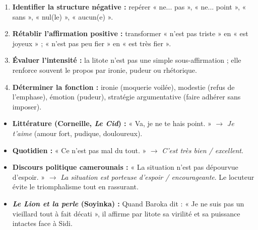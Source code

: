 \documentclass[11pt]{article}
\begin{document}
\begin{methode}
\begin{enumerate}
    \item \textbf{Identifier la structure négative :} repérer « ne... pas », « ne... point », « sans », « nul(le) », « aucun(e) ».
    \item \textbf{Rétablir l'affirmation positive :} transformer « n'est pas triste » en « est joyeux » ; « n'est pas peu fier » en « est très fier ».
    \item \textbf{Évaluer l'intensité :} la litote n'est pas une simple sous-affirmation ; elle renforce souvent le propos par ironie, pudeur ou rhétorique.
    \item \textbf{Déterminer la fonction :} ironie (moquerie voilée), modestie (refus de l'emphase), émotion (pudeur), stratégie argumentative (faire adhérer sans imposer).
\end{enumerate}
\end{methode}

\begin{exemplebox}
\begin{itemize}
    \item \textbf{Littérature (Corneille, \emph{Le Cid}) :} « Va, je ne te hais point. » $\rightarrow$ \emph{Je t'aime} (amour fort, pudique, douloureux).
    \item \textbf{Quotidien :} « Ce n'est pas mal du tout. » $\rightarrow$ \emph{C'est très bien / excellent}.
    \item \textbf{Discours politique camerounais :} « La situation n'est pas dépourvue d'espoir. » $\rightarrow$ \emph{La situation est porteuse d'espoir / encourageante}. Le locuteur évite le triomphalisme tout en rassurant.
    \item \textbf{\emph{Le Lion et la perle} (Soyinka) :} Quand Baroka dit : « Je ne suis pas un vieillard tout à fait décati », il affirme par litote sa virilité et sa puissance intactes face à Sidi.
\end{itemize}
\end{exemplebox}
\end{document}
